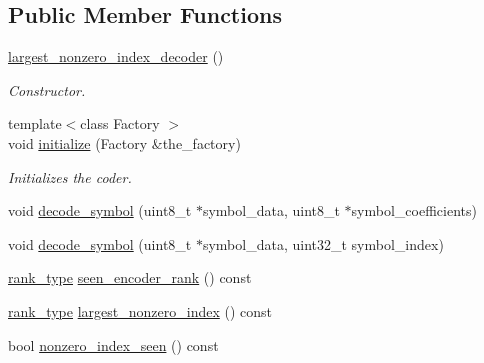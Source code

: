\subsection*{Public Member Functions}
\begin{DoxyCompactItemize}
\item 
\hypertarget{classkodo_1_1largest__nonzero__index__decoder_a042807cc2c2b3b60dbd2d5be211438cf}{\hyperlink{classkodo_1_1largest__nonzero__index__decoder_a042807cc2c2b3b60dbd2d5be211438cf}{largest\-\_\-nonzero\-\_\-index\-\_\-decoder} ()}\label{classkodo_1_1largest__nonzero__index__decoder_a042807cc2c2b3b60dbd2d5be211438cf}

\begin{DoxyCompactList}\small\item\em Constructor. \end{DoxyCompactList}\item 
{\footnotesize template$<$class Factory $>$ }\\void \hyperlink{classkodo_1_1largest__nonzero__index__decoder_a4fdf0b60b478a230c6c0480c6537d0a1}{initialize} (Factory \&the\-\_\-factory)
\begin{DoxyCompactList}\small\item\em Initializes the coder. \end{DoxyCompactList}\item 
void \hyperlink{classkodo_1_1largest__nonzero__index__decoder_aad28e42e820db1fa67de783ffa76889f}{decode\-\_\-symbol} (uint8\-\_\-t $\ast$symbol\-\_\-data, uint8\-\_\-t $\ast$symbol\-\_\-coefficients)
\begin{DoxyCompactList}\small\item\em \end{DoxyCompactList}\item 
void \hyperlink{classkodo_1_1largest__nonzero__index__decoder_ab0a0c84e44afbeee4789b53dafd48c87}{decode\-\_\-symbol} (uint8\-\_\-t $\ast$symbol\-\_\-data, uint32\-\_\-t symbol\-\_\-index)
\begin{DoxyCompactList}\small\item\em \end{DoxyCompactList}\item 
\hyperlink{classkodo_1_1largest__nonzero__index__decoder_a27df8d24f0a91c14f8143d8a88205e7a}{rank\-\_\-type} \hyperlink{classkodo_1_1largest__nonzero__index__decoder_a7cebb206c2a9b821aab53b7c5cf1c986}{seen\-\_\-encoder\-\_\-rank} () const 
\item 
\hyperlink{classkodo_1_1largest__nonzero__index__decoder_a27df8d24f0a91c14f8143d8a88205e7a}{rank\-\_\-type} \hyperlink{classkodo_1_1largest__nonzero__index__decoder_a18121651eb9868d4923e9af8b32de33f}{largest\-\_\-nonzero\-\_\-index} () const 
\item 
bool \hyperlink{classkodo_1_1largest__nonzero__index__decoder_a23cb7afbf21074413152e69b9b376d71}{nonzero\-\_\-index\-\_\-seen} () const 
\end{DoxyCompactItemize}
